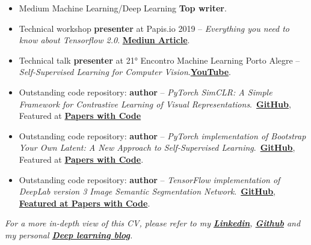 \documentclass[9pt, a4paper, oneside, final]{scrartcl} %
\begin{document}
\begin{itemize}\itemsep1.0pt \parskip1.5pt 
\item Medium Machine Learning/Deep Learning \textbf{Top writer}.

\item Technical workshop \textbf{presenter} at Papis.io 2019 -- \textit{Everything you need to know about Tensorflow 2.0}. 
\textbf{\href{https://towardsdatascience.com/everything-you-need-to-know-about-tensorflow-2-0-b0856960c074?source=friends_link&sk=6e70f541090f2879ef2964736c5b19ad}{Mediun Article}}.

\item Technical talk \textbf{presenter} at 21° Encontro Machine Learning Porto Alegre – \textit{Self-Supervised Learning for Computer Vision}.\textbf{\href{https://www.youtube.com/watch?v=vtuCMO_-igI&t=6163s}{YouTube}}.

\item Outstanding code repository: \textbf{author} – \textit{PyTorch SimCLR: A Simple Framework for Contrastive Learning of Visual Representations}.~\href{https://github.com/sthalles/SimCLR}{\textbf{GitHub}}, Featured at \href{https://paperswithcode.com/paper/a-simple-framework-for-contrastive-learning}{\textbf{Papers with Code}}

\item Outstanding code repository: \textbf{author} – \textit{PyTorch implementation of Bootstrap Your Own Latent: A New Approach to Self-Supervised Learning}.~\href{https://github.com/sthalles/PyTorch-BYOL}{\textbf{GitHub}}, Featured at \href{https://paperswithcode.com/paper/bootstrap-your-own-latent-a-new-approach-to}{\textbf{Papers with Code}}.

\item Outstanding code repository: \textbf{author} – \textit{TensorFlow implementation of DeepLab version 3 Image Semantic Segmentation
Network}.~\href{https://github.com/sthalles/deeplab_v3}{\textbf{GitHub}}, \href{https://paperswithcode.com/paper/rethinking-atrous-convolution-for-semantic}{\textbf{Featured at Papers with Code}}.

\end{itemize}

\textit{For a more in-depth view of this CV, please refer to my \textbf{\href{https://www.linkedin.com/in/thalles-silva-32ab08a3/}{Linkedin}}, \textbf{\href{https://github.com/sthalles}{Github}} and my personal \textbf{\href{https://sthalles.github.io/}{Deep learning blog}}.}
\end{document}
